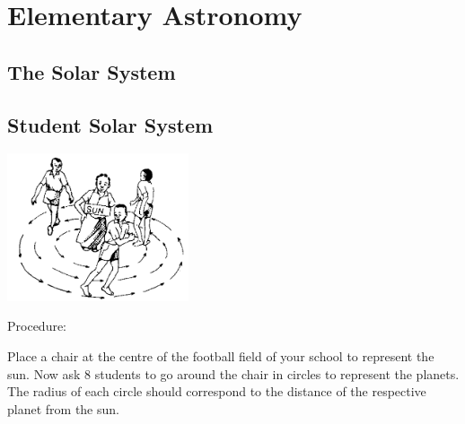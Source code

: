 \section{Elementary Astronomy} 

\begin{multicols}{2}


\section*{The Solar System} 


\subsection{Student Solar System}

\begin{center}
\includegraphics[width=0.4\textwidth]{./img/source/student-solar-system.png}
\end{center}

\begin{description*}
\item[Procedure:]{Place a chair at the centre of the football field of your school to represent the sun. Now ask 8 students to go around the chair in circles to represent the planets. The radius of each circle should correspond to the distance of the respective planet from the sun.

}
\end{description*}
\end{multicols}
